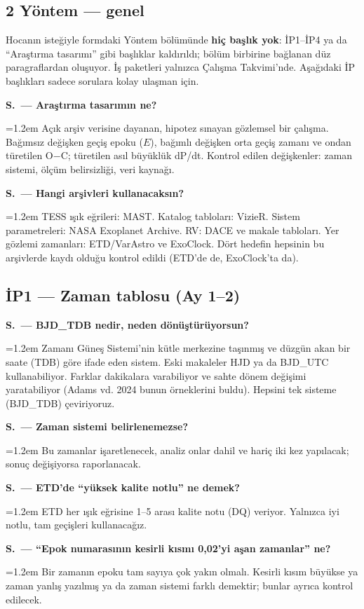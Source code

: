 \documentclass[11pt,a4paper]{article}
\newcounter{sor}[section]
\newcommand{\SC}[2]{\stepcounter{sor}\par\noindent\textbf{S\thesection.\thesor\ — #1}\par\nopagebreak
  \noindent\hangindent=1.2em\hangafter=0 #2\par\vspace{0.35em}}
\newcommand{\OC}{O$-$C}
\begin{document}
\subsection{2 Yöntem — genel}
\begin{bilgi}[Not]
Hocanın isteğiyle formdaki Yöntem bölümünde \textbf{hiç başlık yok}: İP1--İP4 ya da ``Araştırma tasarımı'' gibi başlıklar kaldırıldı; bölüm birbirine bağlanan düz paragraflardan oluşuyor. İş paketleri yalnızca Çalışma Takvimi'nde. Aşağıdaki İP başlıkları sadece sorulara kolay ulaşman için.
\end{bilgi}
\SC{Araştırma tasarımın ne?}{Açık arşiv verisine dayanan, hipotez sınayan gözlemsel bir çalışma. Bağımsız değişken geçiş epoku ($E$), bağımlı değişken orta geçiş zamanı ve ondan türetilen \OC; türetilen asıl büyüklük dP/dt. Kontrol edilen değişkenler: zaman sistemi, ölçüm belirsizliği, veri kaynağı.}
\SC{Hangi arşivleri kullanacaksın?}{TESS ışık eğrileri: MAST. Katalog tabloları: VizieR. Sistem parametreleri: NASA Exoplanet Archive. RV: DACE ve makale tabloları. Yer gözlemi zamanları: ETD/VarAstro ve ExoClock. Dört hedefin hepsinin bu arşivlerde kaydı olduğu kontrol edildi (ETD'de de, ExoClock'ta da).}

\subsection{İP1 — Zaman tablosu (Ay 1--2)}
\SC{BJD\_TDB nedir, neden dönüştürüyorsun?}{Zamanı Güneş Sistemi'nin kütle merkezine taşınmış ve düzgün akan bir saate (TDB) göre ifade eden sistem. Eski makaleler HJD ya da BJD\_UTC kullanabiliyor. Farklar dakikalara varabiliyor ve sahte dönem değişimi yaratabiliyor (Adams vd. 2024 bunun örneklerini buldu). Hepsini tek sisteme (BJD\_TDB) çeviriyoruz.}
\SC{Zaman sistemi belirlenemezse?}{Bu zamanlar işaretlenecek, analiz onlar dahil ve hariç iki kez yapılacak; sonuç değişiyorsa raporlanacak.}
\SC{ETD'de ``yüksek kalite notlu'' ne demek?}{ETD her ışık eğrisine 1--5 arası kalite notu (DQ) veriyor. Yalnızca iyi notlu, tam geçişleri kullanacağız.}
\SC{``Epok numarasının kesirli kısmı 0,02'yi aşan zamanlar'' ne?}{Bir zamanın epoku tam sayıya çok yakın olmalı. Kesirli kısım büyükse ya zaman yanlış yazılmış ya da zaman sistemi farklı demektir; bunlar ayrıca kontrol edilecek.}
\end{document}
